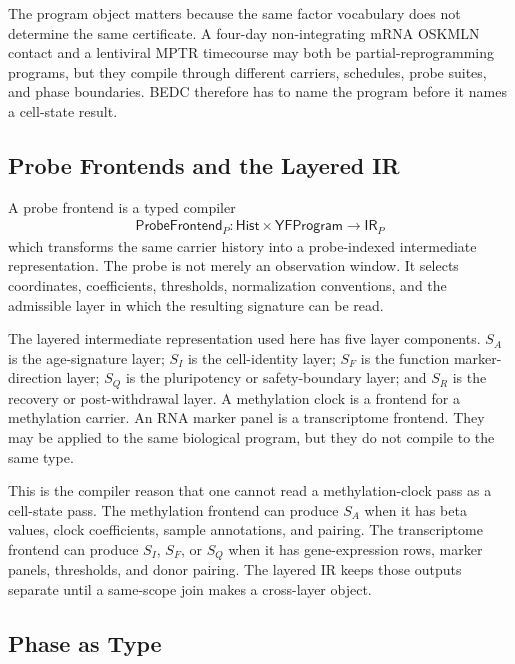 The program object matters because the same factor vocabulary does not determine the same certificate. A four-day non-integrating mRNA OSKMLN contact and a lentiviral MPTR timecourse may both be partial-reprogramming programs, but they compile through different carriers, schedules, probe suites, and phase boundaries. BEDC therefore has to name the program before it names a cell-state result.

\subsection{Probe Frontends and the Layered IR}

\begin{definition}
\label{def:probe-frontend}
A probe frontend is a typed compiler
$$
\begin{aligned}
\mathsf{ProbeFrontend}_P:\mathsf{Hist}\times\mathsf{YFProgram}\to \mathsf{IR}_P
\end{aligned}
$$
which transforms the same carrier history into a probe-indexed intermediate representation. The probe is not merely an observation window. It selects coordinates, coefficients, thresholds, normalization conventions, and the admissible layer in which the resulting signature can be read.
\end{definition}

The layered intermediate representation used here has five layer components. $S_A$ is the age-signature layer; $S_I$ is the cell-identity layer; $S_F$ is the function marker-direction layer; $S_Q$ is the pluripotency or safety-boundary layer; and $S_R$ is the recovery or post-withdrawal layer. A methylation clock is a frontend for a methylation carrier. An RNA marker panel is a transcriptome frontend. They may be applied to the same biological program, but they do not compile to the same type.

This is the compiler reason that one cannot read a methylation-clock pass as a cell-state pass. The methylation frontend can produce $S_A$ when it has beta values, clock coefficients, sample annotations, and pairing. The transcriptome frontend can produce $S_I$, $S_F$, or $S_Q$ when it has gene-expression rows, marker panels, thresholds, and donor pairing. The layered IR keeps those outputs separate until a same-scope join makes a cross-layer object.

\subsection{Phase as Type}

